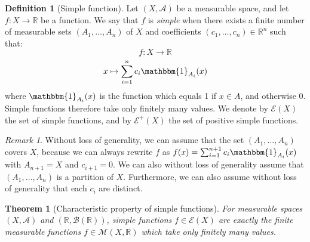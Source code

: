 \documentclass{article}
\newtheorem{theorem}{Theorem}[section]
\theoremstyle{definition}
\newtheorem{definition}{Definition}[section]
\theoremstyle{remark}
\newtheorem*{remark}{Remark}
\theoremstyle{example}
\theoremstyle{notation}
\begin{document}
\begin{definition}[Simple function] %
		Let $(X, \mathcal{A})$ be a measurable space, and let $f : X \rightarrow \mathbb{R}$ be a function. We say that $f$ is \textit{simple} when there exists a finite number of measurable sets $(A_1, \dots, A_n)$ of $X$ and coefficients $(c_1, \dots, c_n) \in \mathbb{R}^n$ such that:
				$$f : X \rightarrow \mathbb{R}$$
				$$x \mapsto \sum_{i=1}^n c_i \mathbbm{1}_{A_i}(x)$$
				where $\mathbbm{1}_{A_i}(x)$ is the function which equals 1 if $x \in A$, and otherwise 0. Simple functions therefore take only finitely many values. We denote by $\mathcal{E}(X)$ the set of simple functions, and by $\mathcal{E}^+(X)$ the set of positive simple functions.
\end{definition}

\begin{remark}
		Without loss of generality, we can assume that the set $(A_1, \dots, A_n)$ covers $X$, because we can always rewrite $f$ as $f(x) = \sum_{i=1}^{n+1} c_i \mathbbm{1}_{A_i}(x)$ with $A_{n+1} = X$ and $c_{i+1} = 0$. We can also without loss of generality assume that $(A_1, \dots, A_n)$ is a partition of $X$. Furthermore, we can also assume without loss of generality that each $c_i$ are distinct.
\end{remark}

\begin{theorem}[Characteristic property of simple functions] \label{thm:simple-function-charac}
		For measurable spaces $(X, \mathcal{A})$ and $(\mathbb{R}, \mathcal{B}(\mathbb{R}))$, simple functions $f \in \mathcal{E}(X)$ are exactly the finite measurable functions $f \in \mathcal{M}(X, \mathbb{R})$ which take only finitely many values.
\end{theorem}
\end{document}
